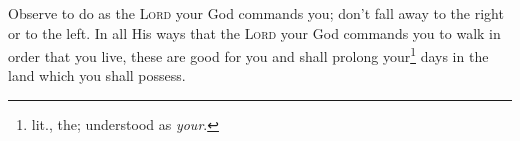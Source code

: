 \begin{inparaenum}
     Observe to do as the \textsc{Lord} your God commands you; don't fall away to the right or to the left.%
     In all His ways that the \textsc{Lord} your God commands you to walk in order that you live, these are good for you and shall prolong your\footnote{lit., the; understood as \textit{your}.} days in the land which you shall possess.%
\end{inparaenum}
